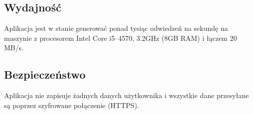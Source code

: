 \documentclass{article}
\begin{document}
    \subsection{Wydajność}
    Aplikacja jest w stanie generować ponad tysiąc odwiedzeń na sekundę na maszynie z procesorem Intel Core i5--4570, 3.2GHz (8GB RAM) i łączem 20 MB/s.
    
    \subsection{Bezpieczeństwo}
    Aplikacja nie zapisuje żadnych danych użytkownika i wszystkie dane przesyłane są poprzez szyfrowane połączenie (HTTPS).
    
    
\end{document}
